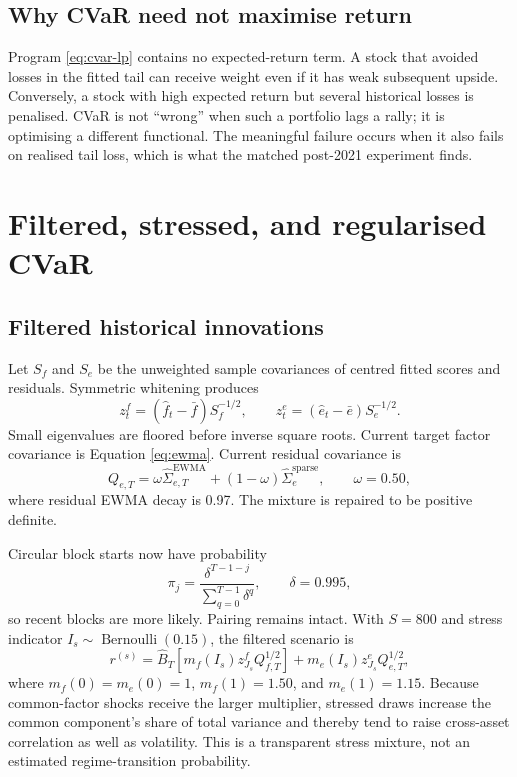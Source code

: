 \documentclass[11pt,a4paper]{article}
\newcommand{\wh}{\widehat}
\begin{document}
\subsection{Why CVaR need not maximise return}

Program \eqref{eq:cvar-lp} contains no expected-return term. A stock that avoided losses in the fitted tail can receive weight even if it has weak subsequent upside. Conversely, a stock with high expected return but several historical losses is penalised. CVaR is not ``wrong'' when such a portfolio lags a rally; it is optimising a different functional. The meaningful failure occurs when it also fails on realised tail loss, which is what the matched post-2021 experiment finds.

\section{Filtered, stressed, and regularised CVaR}

\subsection{Filtered historical innovations}

Let $S_f$ and $S_e$ be the unweighted sample covariances of centred fitted scores and residuals. Symmetric whitening produces
\begin{equation}
 z^f_t=(\wh f_t-\bar f)S_f^{-1/2},
 \qquad z^e_t=(\wh e_t-\bar e)S_e^{-1/2}.
\end{equation}
Small eigenvalues are floored before inverse square roots. Current target factor covariance is Equation \eqref{eq:ewma}. Current residual covariance is
\begin{equation}
 Q_{e,T}=\omega\wh\Sigma_{e,T}^{\text{EWMA}}
 +(1-\omega)\wh\Sigma_e^{\text{sparse}},
 \qquad \omega=0.50,
 \label{eq:residual-blend}
\end{equation}
where residual EWMA decay is 0.97. The mixture is repaired to be positive definite.

Circular block starts now have probability
\begin{equation}
 \pi_j=\frac{\delta^{T-1-j}}{\sum_{q=0}^{T-1}\delta^q},
 \qquad \delta=0.995,
\end{equation}
so recent blocks are more likely. Pairing remains intact. With $S=800$ and stress indicator $I_s\sim\operatorname{Bernoulli}(0.15)$, the filtered scenario is
\begin{equation}
 r^{(s)}=\wh B_T\left[m_f(I_s)z^f_{J_s}Q_{f,T}^{1/2}\right]
 +m_e(I_s)z^e_{J_s}Q_{e,T}^{1/2},
 \label{eq:filtered-scenario}
\end{equation}
where $m_f(0)=m_e(0)=1$, $m_f(1)=1.50$, and $m_e(1)=1.15$. Because common-factor shocks receive the larger multiplier, stressed draws increase the common component's share of total variance and thereby tend to raise cross-asset correlation as well as volatility. This is a transparent stress mixture, not an estimated regime-transition probability.
\end{document}
